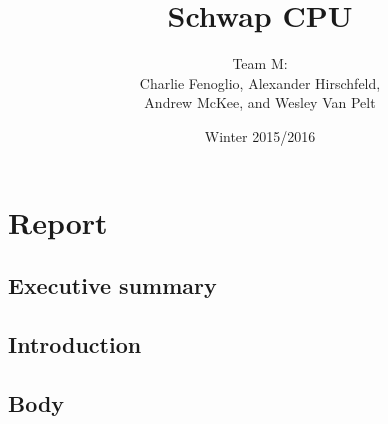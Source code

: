 \documentclass{report}
\title{Schwap CPU}
\author{Team M: \\ Charlie Fenoglio, Alexander Hirschfeld, \\ Andrew McKee, and Wesley Van Pelt}
\date{Winter 2015/2016}
\begin{document}
\maketitle
\setcounter{tocdepth}{4}
\tableofcontents

\chapter{Report}
	\section{Executive summary}
	\section{Introduction}
	\section{Body}
\end{document}
